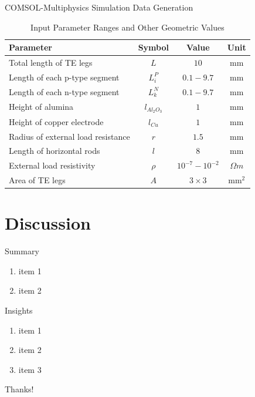 \documentclass{beamer}
\begin{document}
\begin{frame}{COMSOL-Multiphysics Simulation Data Generation}
    \begin{table}[htbp]
    \caption{Input Parameter Ranges and Other Geometric Values}
    \centering
    \begin{tabular}{@{}lccc@{}}
    \toprule
    Parameter & Symbol & Value & Unit \\ \midrule
    Total length of TE legs & $L$ & $10$ & mm \\
    Length of each p-type segment & $L_i^P$ & $0.1 - 9.7$ & mm \\
    Length of each n-type segment & $L_k^N$ & $0.1 - 9.7$ & mm \\
    Height of alumina & $l_{Al_2O_3}$ & $1$ & mm \\
    Height of copper electrode & $l_{Cu}$ & $1$ & mm \\
    Radius of external load resistance & $r$ & $1.5$ & mm \\
    Length of horizontal rods & $l$ & $8$ & mm \\
    External load resistivity & $\rho$  & $10^{-7} - 10^{-2}$ & $\Omega m$ \\
    Area of TE legs & $A$ & $3 \times 3$ & mm$^2$ \\ \bottomrule
    \end{tabular}
    \end{table}
\end{frame}


\section{Discussion}

\begin{frame}
    \begin{block}{Summary}
        \begin{enumerate}
            \item item 1
            \item item 2
        \end{enumerate}
    \end{block}
    \begin{alertblock}{Insights}
        \begin{enumerate}
            \item item 1
            \item item 2
            \item item 3
        \end{enumerate}
    \end{alertblock}
\end{frame}

\begin{frame}
    \begin{center}
        {\Huge\calligra Thanks!}
    \end{center}
\end{frame}
\end{document}
